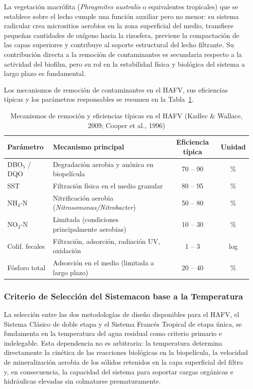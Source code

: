 \documentclass[12pt,a4paper]{article}
\begin{document}
La vegetación macrófita (\textit{Phragmites australis} o equivalentes tropicales) que se establece sobre el lecho cumple una función auxiliar pero no menor: su sistema radicular crea micrositios aerobios en la zona superficial del medio, transfiere pequeñas cantidades de oxígeno hacia la rizosfera, previene la compactación de las capas superiores y contribuye al soporte estructural del lecho filtrante. Su contribución directa a la remoción de contaminantes es secundaria respecto a la actividad del biofilm, pero su rol en la estabilidad física y biológica del sistema a largo plazo es fundamental.

Los mecanismos de remoción de contaminantes en el HAFV, sus eficiencias típicas y los parámetros responsables se resumen en la Tabla~\ref{tab:mecanismos_hafv}.

\begin{table}[H]
\centering
\caption{Mecanismos de remoción y eficiencias típicas en el HAFV (Kadlec \& Wallace, 2009; Cooper et al., 1996)}
\label{tab:mecanismos_hafv}
\begin{tabular}{p{2.2cm}p{6.5cm}cc}
\toprule
\textbf{Parámetro} & \textbf{Mecanismo principal} & \textbf{Eficiencia típica} & \textbf{Unidad} \\
\midrule
DBO$_5$ / DQO & Degradación aerobia y anóxica en biopelícula & 70 -- 90 & \% \\
SST & Filtración física en el medio granular & 80 -- 95 & \% \\
NH$_4$-N & Nitrificación aerobia (\textit{Nitrosomonas/Nitrobacter}) & 50 -- 80 & \% \\
NO$_3$-N & Limitada (condiciones principalmente aerobias) & 10 -- 30 & \% \\
Colif. fecales & Filtración, adsorción, radiación UV, oxidación & 1 -- 3 & log \\
Fósforo total & Adsorción en el medio (limitada a largo plazo) & 20 -- 40 & \% \\
\bottomrule
\end{tabular}
\end{table}

\subsubsection*{Criterio de Selección del Sistemacon base a la  Temperatura}

La selección entre las dos metodologías de diseño disponibles para el HAFV, el Sistema Clásico de doble etapa y el Sistema Francés Tropical de etapa única, se fundamenta en la temperatura del agua residual como criterio primario e indelegable. Esta dependencia no es arbitraria: la temperatura determina directamente la cinética de las reacciones biológicas en la biopelícula, la velocidad de mineralización aerobia de los sólidos retenidos en la capa superficial del filtro y, en consecuencia, la capacidad del sistema para soportar cargas orgánicas e hidráulicas elevadas sin colmatarse prematuramente.
\end{document}
